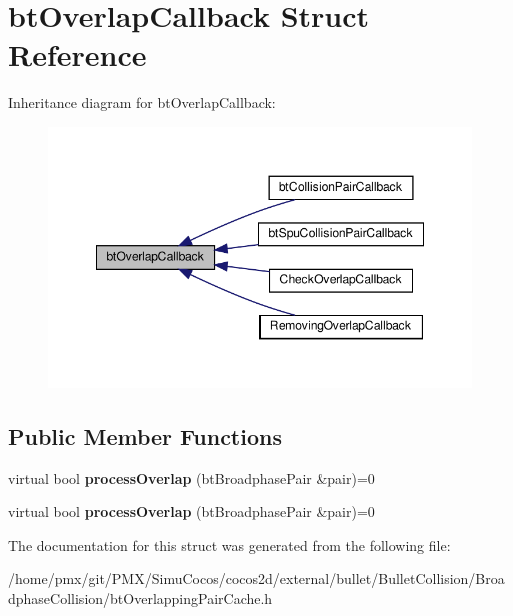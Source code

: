 \hypertarget{structbtOverlapCallback}{}\section{bt\+Overlap\+Callback Struct Reference}
\label{structbtOverlapCallback}


Inheritance diagram for bt\+Overlap\+Callback\+:
\nopagebreak
\begin{figure}[H]
\begin{center}
\leavevmode
\includegraphics[width=348pt]{structbtOverlapCallback__inherit__graph}
\end{center}
\end{figure}
\subsection*{Public Member Functions}
\begin{DoxyCompactItemize}
\item 
\mbox{\label{structbtOverlapCallback_a43c2553686960e509a62cd8957da492f}} 
virtual bool {\bfseries process\+Overlap} (bt\+Broadphase\+Pair \&pair)=0
\item 
\mbox{\label{structbtOverlapCallback_a43c2553686960e509a62cd8957da492f}} 
virtual bool {\bfseries process\+Overlap} (bt\+Broadphase\+Pair \&pair)=0
\end{DoxyCompactItemize}


The documentation for this struct was generated from the following file\+:\begin{DoxyCompactItemize}
\item 
/home/pmx/git/\+P\+M\+X/\+Simu\+Cocos/cocos2d/external/bullet/\+Bullet\+Collision/\+Broadphase\+Collision/bt\+Overlapping\+Pair\+Cache.\+h\end{DoxyCompactItemize}
